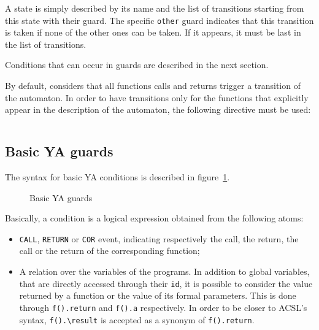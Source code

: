 \documentclass{frama-c-book}
\begin{document}
A state is simply described by its name and the list of transitions
starting from this state with their guard. The specific \lstinline|other|
guard indicates that this transition is taken if none of the other ones
can be taken. If it appears, it must be last in the list of transitions.

Conditions that can occur in guards are described in the next section.

\begin{new}
By default, \aorai considers that all functions calls and returns trigger
a transition of the automaton. In order to have transitions only for the
functions that explicitly appear in the description of the automaton, the
following directive must be used:
\begin{lstlisting}[language=ya]
%explicit transitions;
\end{lstlisting}
\end{new}

\subsection{Basic YA guards}\label{sec:basic-ya-guards}
The syntax for basic YA conditions is described in
figure~\ref{fig:basic_ya}.
\lstset{language=ya}
\begin{figure}

\caption{Basic YA guards}\label{fig:basic_ya}
\end{figure}

Basically, a condition is a logical expression obtained from the following
atoms:
\begin{itemize}
\item \lstinline|CALL|, \lstinline|RETURN| or \lstinline|COR| event, indicating
  respectively the call, the return, the call or the return
  of the corresponding function;
\item A relation over the variables of the programs. In addition to global
variables, that are directly accessed through their \lstinline|id|,
it is possible to consider the value returned by a function or the value of
its formal parameters. This is done through
\lstinline|f().return| and \lstinline|f().a| respectively.
In order to be closer to ACSL's syntax,
\lstinline|f().\result| is accepted as a synonym
of \lstinline|f().return|.
\end{itemize}
\end{document}
